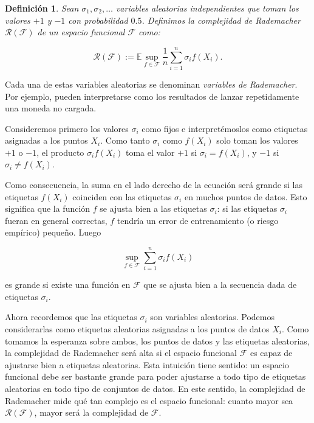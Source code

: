 \documentclass{report}
\newtheorem{dfn}{Definición}[section]
\begin{document}
\begin{dfn}
Sean \(\sigma_1, \sigma_2, \dots\) variables aleatorias independientes que toman los valores \(+1\) y \(-1\) 
con probabilidad \(0.5\). Definimos la complejidad de Rademacher \(\mathscr{R}(\mathcal{F})\) de un espacio funcional 
\(\mathcal{F}\) como:

\[
    \mathscr{R}(\mathcal{F}) := \mathbb{E} \sup_{f \in \mathcal{F}} \frac{1}{n} \sum_{i=1}^{n} \sigma_i f(X_i).
\]
\end{dfn}

Cada una de estas variables aleatorias se denominan \textit{variables de Rademacher}. 
Por ejemplo, pueden interpretarse como los resultados de lanzar repetidamente una moneda no cargada. 

Consideremos primero los valores \(\sigma_i\) como fijos e interpretémoslos como etiquetas asignadas a los puntos \(X_i\). Como tanto 
\(\sigma_i\) como \(f(X_i)\) solo toman los valores \(+1\) o \(-1\), el producto \(\sigma_i f(X_i)\) toma el 
valor \(+1\) si \(\sigma_i = f(X_i)\), y \(-1\) si \(\sigma_i \neq f(X_i)\). \newline

Como consecuencia, la suma en el lado derecho de la ecuación será grande si las etiquetas \(f(X_i)\) 
coinciden con las etiquetas \(\sigma_i\) en muchos puntos de datos. Esto significa que la función \(f\) 
se ajusta bien a las etiquetas \(\sigma_i\): si las etiquetas \(\sigma_i\) fueran en general correctas, 
\(f\) tendría un error de entrenamiento (o riesgo empírico) pequeño. Luego

\[
\sup_{f \in \mathcal{F}} \sum_{i=1}^{n} \sigma_i f(X_i)
\]

es grande si existe una función en \(\mathcal{F}\) que se ajusta bien a la secuencia dada de etiquetas \(\sigma_i\). \newline

Ahora recordemos que las etiquetas \(\sigma_i\) son variables aleatorias. Podemos considerarlas 
como etiquetas aleatorias asignadas a los puntos de datos \(X_i\). Como tomamos la esperanza sobre ambos, los 
puntos de datos y las etiquetas aleatorias, la complejidad de Rademacher será alta si el espacio funcional 
\(\mathcal{F}\) es capaz de ajustarse bien a etiquetas aleatorias. Esta intuición tiene sentido: un espacio 
funcional debe ser bastante grande para poder ajustarse a todo tipo de etiquetas aleatorias en todo tipo de 
conjuntos de datos. En este sentido, la complejidad de Rademacher mide qué tan complejo es el espacio 
funcional: cuanto mayor sea \(\mathscr{R}(\mathcal{F})\), mayor será la complejidad de \(\mathcal{F}\).\newline
\end{document}
